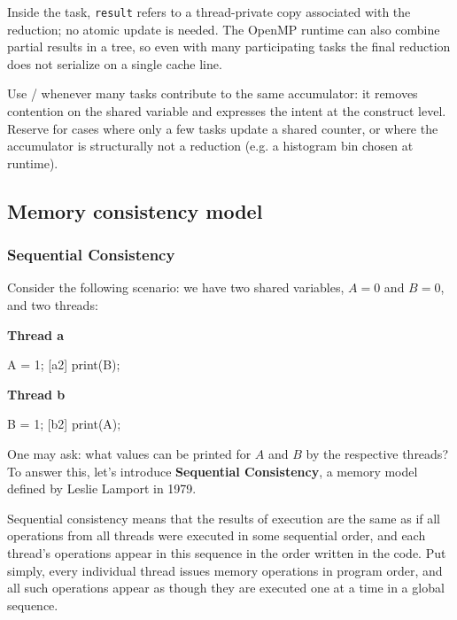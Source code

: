 Inside the task, \texttt{result} refers to a thread-private copy associated with the reduction; no atomic update is needed. The OpenMP runtime can also combine partial results in a tree, so even with many participating tasks the final reduction does not serialize on a single cache line.

\begin{tipsblock}
Use / whenever many tasks contribute to the same accumulator: it removes contention on the shared variable and expresses the intent at the construct level. Reserve  for cases where only a few tasks update a shared counter, or where the accumulator is structurally not a reduction (e.g. a histogram bin chosen at runtime).
\end{tipsblock}

\subsection{Memory consistency model}

\subsubsection{Sequential Consistency}

Consider the following scenario: we have two shared variables, $A = 0$ and $B = 0$, and two threads:

\begin{minipage}{0.48\textwidth}
    \centering
    \textbf{Thread a}
    \begin{codeblock}[language = C, numbers=none]
    [a1] A = 1;
    [a2] print(B);
    \end{codeblock}
\end{minipage}%
\hfill
\begin{minipage}{0.48\textwidth}
    \centering
    \textbf{Thread b}
    \begin{codeblock}[language = C, numbers=none]
    [b1] B = 1;
    [b2] print(A);
    \end{codeblock}
\end{minipage}

One may ask: what values can be printed for $A$ and $B$ by the respective threads? To answer this, let's introduce \textbf{Sequential Consistency}, a memory model defined by Leslie Lamport in 1979.

Sequential consistency means that the results of execution are the same as if all operations from all threads were executed in some sequential order, and each thread's operations appear in this sequence in the order written in the code.
Put simply, every individual thread issues memory operations in program order, and all such operations appear as though they are executed one at a time in a global sequence.

